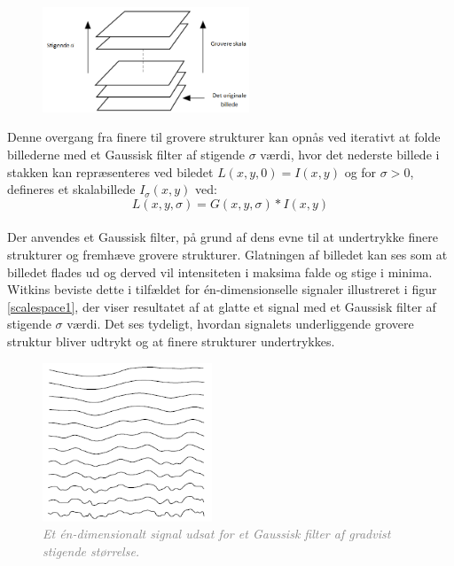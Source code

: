 \begin{figure}[H]
    \centering
    \includegraphics[width=0.55\textwidth]{fig/32.png}
     \vspace{-1em}
    \begin{center}    
       \caption{\textcolor{gray}{\footnotesize \textit{ }}}
    \label{fig:scalerep}
     \end{center}
     \vspace{-2.5em}
  \end{figure} \noindent
Denne overgang fra finere til grovere strukturer kan opnås ved iterativt at folde billederne med et Gaussisk filter af stigende $\sigma$ værdi, hvor det nederste billede i stakken kan repræsenteres ved biledet $ L(x,y,0) = I(x,y)$ og for $\sigma>0$, defineres et skalabillede $I_\sigma(x,y)$ ved:
\begin{equation}
L(x,y,\sigma) = G(x,y,\sigma)\ast I(x,y)
\label{scalespace1}
\end{equation}
\\
Der anvendes et Gaussisk filter, på grund af dens evne til at undertrykke finere strukturer og fremhæve grovere strukturer.
Glatningen af billedet kan ses som at billedet flades ud og derved vil intensiteten i maksima falde og stige i minima.  Witkins \cite{witkins} beviste dette i tilfældet for én-dimensionselle signaler illustreret i  figur  \ref{scalespace1}, der viser resultatet af at glatte et signal med et Gaussisk filter af stigende $\sigma$ værdi. Det ses tydeligt, hvordan signalets underliggende grovere struktur bliver udtrykt og at finere strukturer undertrykkes.
\begin{figure}[H]
    \centering
    \includegraphics[width=0.45\textwidth]{fig/33.png}
     \vspace{-1em}
    \begin{center}    
       \caption{\textcolor{gray}{\footnotesize \textit{Et én-dimensionalt signal udsat for et Gaussisk filter af gradvist stigende størrelse.}}}
    \label{fig:scalereps}
     \end{center}
     \vspace{-2.5em}
  \end{figure} \noindent
